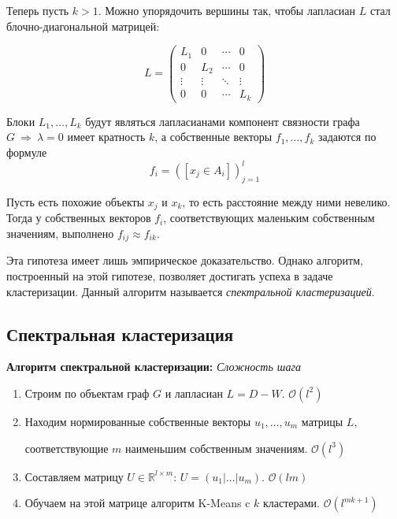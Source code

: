 \documentclass[12pt,fleqn]{article}
\begin{document}
\begin{vkProof}
Теперь пусть $k>1$. Можно упорядочить вершины так, чтобы лапласиан $L$ стал блочно-диагональной матрицей:

\[
L =
\begin{pmatrix}
L_1&0&\cdots &0\\ 
0&L_2&\cdots &0\\
\vdots &\vdots &\ddots &\vdots \\
0&0&\cdots & L_k
\end{pmatrix}
\]

Блоки $L_1, \dots, L_k$ будут являться лапласианами компонент связности графа $G\ \Rightarrow\ \lambda=0$ имеет кратность $k$, а собственные векторы $f_1, \dots, f_k$ задаются по формуле 
\[
f_i = \left([x_j\in A_i]\right)_{j=1}^{l}
\]
\end{vkProof}

\begin{vkHypothesis}
Пусть есть похожие объекты $x_j$ и $x_k$, то есть расстояние между ними невелико.
Тогда у собственных векторов $f_i$, соответствующих маленьким собственным значениям, выполнено $f_{ij} \approx f_{ik}$. 
\end{vkHypothesis}

Эта гипотеза имеет лишь эмпирическое доказательство. Однако алгоритм, построенный на этой гипотезе, позволяет достигать успеха в задаче кластеризации. Данный алгоритм называется {\it спектральной кластеризацией}.

\subsection{Спектральная кластеризация}

{\bf Алгоритм спектральной кластеризации:}
\null\hfill {\it Сложность шага}
\begin{enumerate}
    \item Строим по объектам граф $G$ и лапласиан $L = D - W$.
    \null\hfill $\mathcal{O}(l^2)$
    \item Находим нормированные собственные векторы $u_1, \dots, u_m$ матрицы $L$, \par соответствующие $m$ наименьшим собственным значениям.  \null\hfill $\mathcal{O}(l^3)$
    \item Составляем матрицу $U \in \mathbb R^{l \times m}$:
    $U = (u_1 | \dots | u_m)$.
    \null\hfill$\mathcal{O}(lm)$
    \item Обучаем на этой матрице алгоритм K-Means c $k$ кластерами.
   \null\hfill$\mathcal{O}(l^{mk+1})$
\end{enumerate}
\end{document}
